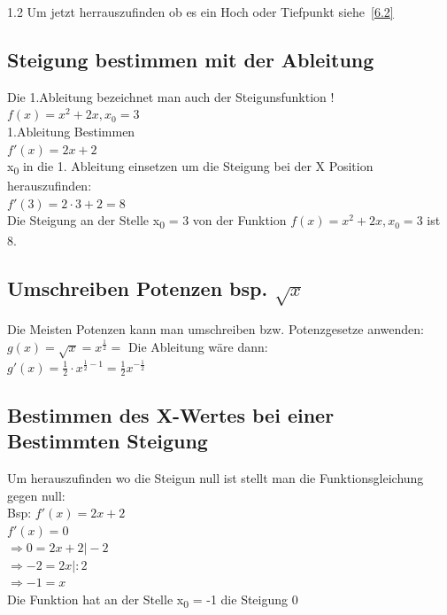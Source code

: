 \documentclass{article}
\newcommand{\Zeilenabstand}{1.2}
\begin{document}
\begin{spacing}{\Zeilenabstand}
    Um jetzt herrauszufinden ob es ein Hoch oder Tiefpunkt siehe~\ref{6.2}

    

            \subsection{Steigung bestimmen mit der Ableitung}
                Die 1.Ableitung bezeichnet man auch der Steigunsfunktion !\\
                $f(x) = x^2 + 2x,x_0 = 3$\\
                1.Ableitung Bestimmen\\
                $f'(x) = 2x + 2 $\\
                x\textsubscript{0} in die 1. Ableitung einsetzen um die Steigung bei der X Position 
                herauszufinden:\\
                $f'(3)= 2 \cdot 3+ 2 = 8 $\\
                Die Steigung an der Stelle x\textsubscript{0} = 3 von der Funktion $f(x) = x^2 + 2x,x_0 = 3$ ist 8.

            \subsection{Umschreiben Potenzen bsp. ${\sqrt{x}} $}
                Die Meisten Potenzen kann man umschreiben bzw. Potenzgesetze anwenden:\\
                $g(x) = \sqrt{x} = x^{\frac{1}{2}} = $ Die Ableitung wäre dann:\\
                $g'(x) = \frac{1}{2} \cdot x^{\frac{1}{2}-1} = \frac{1}{2}x^{-\frac{1}{2}}$ %

            \subsection{Bestimmen des X-Wertes bei einer Bestimmten Steigung}
                Um herauszufinden wo die Steigun null ist stellt man die Funktionsgleichung gegen null:\\
                Bsp: 
                $ f'(x) = 2x + 2$\\
                $ f'(x) = 0 $\\
                $\Rightarrow0=2x+2  \vert -2 $\\
                $\Rightarrow -2= 2x \vert :2 $ \\
                $\Rightarrow -1 = x $\\
                Die Funktion hat an der Stelle x\textsubscript{0} = -1 die Steigung 0




\end{spacing}
\end{document}
